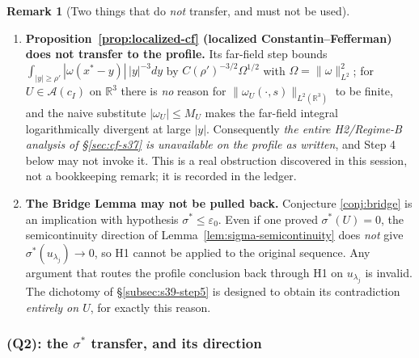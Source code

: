 \documentclass[11pt]{article}
\theoremstyle{definition}
\newtheorem{remark}[theorem]{Remark}
\theoremstyle{remark}
\newcommand{\R}{\mathbb{R}}
\begin{document}
\begin{remark}[Two things that do \emph{not} transfer, and must not be used]
  \label{rem:s39-nontransfer}
  \begin{enumerate}[label=(\roman*)]
  \item \textbf{Proposition~\ref{prop:localized-cf} (localized
    Constantin--Fefferman) does not transfer to the profile.} Its far-field
    step bounds
    $\int_{|y|\geq\rho'}|\omega(x^*-y)|\,|y|^{-3}dy$ by
    $C(\rho')^{-3/2}\Omega^{1/2}$ with
    $\Omega=\|\omega\|_{L^2}^2$; for $U\in\mathcal{A}(c_I)$ on $\R^3$ there is
    \emph{no} reason for $\|\omega_U(\cdot,s)\|_{L^2(\R^3)}$ to be finite, and
    the naive substitute $|\omega_U|\leq M_U$ makes the far-field integral
    logarithmically divergent at large $|y|$. Consequently \emph{the entire
    H2/Regime-B analysis of \S\ref{sec:cf-s37} is unavailable on the profile
    as written}, and Step 4 below may not invoke it. This is a real
    obstruction discovered in this session, not a bookkeeping remark; it is
    recorded in the ledger.
  \item \textbf{The Bridge Lemma may not be pulled back.} Conjecture
    \ref{conj:bridge} is an implication with hypothesis
    $\sigma^*\leq\varepsilon_0$. Even if one proved $\sigma^*(U)=0$, the
    semicontinuity direction of Lemma~\ref{lem:sigma-semicontinuity} does
    \emph{not} give $\sigma^*(u_{\lambda_j})\to0$, so H1 cannot be applied to
    the original sequence. Any argument that routes the profile conclusion
    back through H1 on $u_{\lambda_j}$ is invalid. The dichotomy of
    \S\ref{subsec:s39-step5} is designed to obtain its contradiction
    \emph{entirely on $U$}, for exactly this reason.
  \end{enumerate}
\end{remark}

\subsubsection*{(Q2): the $\sigma^*$ transfer, and its direction}
\end{document}

